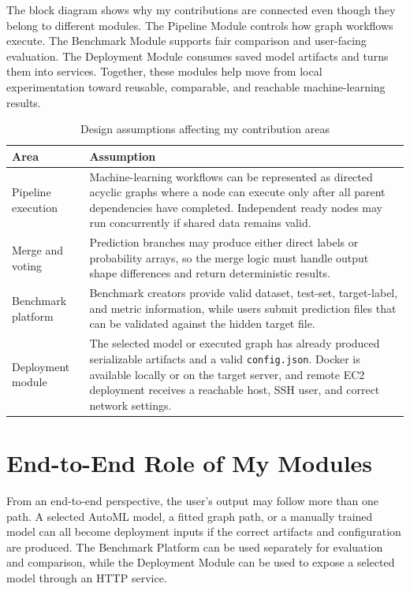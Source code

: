 \documentclass[12pt,a4paper,oneside]{report}
\newcommand{\modulepath}[1]{\texttt{#1}}
\begin{document}
The block diagram shows why my contributions are connected even though they belong to different modules. The Pipeline Module controls how graph workflows execute. The Benchmark Module supports fair comparison and user-facing evaluation. The Deployment Module consumes saved model artifacts and turns them into services. Together, these modules help move from local experimentation toward reusable, comparable, and reachable machine-learning results.

\begin{table}[H]
\centering
\small
\caption{Design assumptions affecting my contribution areas}
\label{tab:individual-design-assumptions}
\begin{tabularx}{\textwidth}{p{}X}
\toprule
\textbf{Area} & \textbf{Assumption} \\
\midrule
Pipeline execution &
Machine-learning workflows can be represented as directed acyclic graphs where a node can execute only after all parent dependencies have completed. Independent ready nodes may run concurrently if shared data remains valid. \\
\midrule
Merge and voting &
Prediction branches may produce either direct labels or probability arrays, so the merge logic must handle output shape differences and return deterministic results. \\
\midrule
Benchmark platform &
Benchmark creators provide valid dataset, test-set, target-label, and metric information, while users submit prediction files that can be validated against the hidden target file. \\
\midrule
Deployment module &
The selected model or executed graph has already produced serializable artifacts and a valid \modulepath{config.json}. Docker is available locally or on the target server, and remote EC2 deployment receives a reachable host, SSH user, and correct network settings. \\
\bottomrule
\end{tabularx}
\end{table}

\section{End-to-End Role of My Modules}
From an end-to-end perspective, the user's output may follow more than one path. A selected AutoML model, a fitted graph path, or a manually trained model can all become deployment inputs if the correct artifacts and configuration are produced. The Benchmark Platform can be used separately for evaluation and comparison, while the Deployment Module can be used to expose a selected model through an HTTP service.
\end{document}
